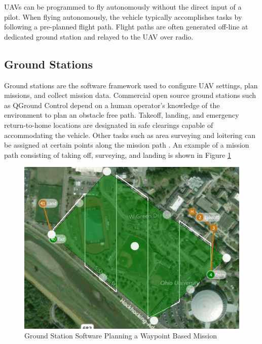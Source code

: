 \documentclass[numbered,pdftex]{ohio-etd}
\begin{document}
UAVs can be programmed to fly autonomously without the direct input of a pilot. When flying autonomously, the vehicle typically accomplishes tasks by following a pre-planned flight path. Flight paths are often generated off-line at dedicated ground station and relayed to the UAV over radio. 

\subsection{Ground Stations}
Ground stations are the software framework used to configure UAV settings, plan missions, and collect mission data. Commercial open source ground stations such as QGround Control \cite{qgc} depend on a human operator's knowledge of the environment to plan an obstacle free path. Takeoff, landing, and emergency return-to-home locations are designated in safe clearings capable of accommodating the vehicle. Other tasks such as area surveying and loitering can be assigned at certain points along the mission path \cite{wilhelm_direct_2017}. An example of a mission path consisting of taking off, surveying, and landing is shown in Figure \ref{fig:groundstationplanning}




\begin{figure}[H]
	\centering
	\includegraphics[width=12cm]{PaperFigures/Literature/groundStationPlanning}
	\caption{Ground Station Software Planning a Waypoint Based Mission}
	\label{fig:groundstationplanning}
\end{figure}
\end{document}
